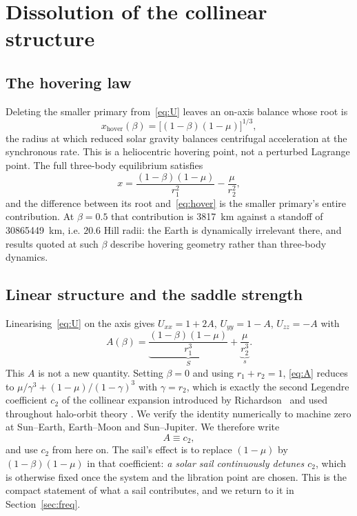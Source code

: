 \documentclass[pdflatex,sn-mathphys-num]{sn-jnl}
\begin{document}
\section{Dissolution of the collinear structure}\label{sec:dissolution}

\subsection{The hovering law}

Deleting the smaller primary from~\eqref{eq:U} leaves an on-axis balance whose
root is
\begin{equation}
  x_{\mathrm{hover}}(\beta) = \bigl[(1-\beta)(1-\mu)\bigr]^{1/3},
  \label{eq:hover}
\end{equation}
the radius at which reduced solar gravity balances centrifugal acceleration at
the synchronous rate. This is a heliocentric hovering point, not a perturbed
Lagrange point. The full three-body equilibrium satisfies
\begin{equation}
  x = \frac{(1-\beta)(1-\mu)}{r_1^{2}} - \frac{\mu}{r_2^{2}} ,
  \label{eq:balance}
\end{equation}
and the difference between its root and~\eqref{eq:hover} is the smaller
primary's entire contribution. At $\beta=0.5$ that contribution is
\SI{3817}{\kilo\metre} against a standoff of \SI{30865449}{\kilo\metre}, i.e.
$20.6$ Hill radii: the Earth is dynamically irrelevant there, and results quoted
at such $\beta$ describe hovering geometry rather than three-body dynamics.

\subsection{Linear structure and the saddle strength}

Linearising~\eqref{eq:U} on the axis gives
$U_{xx}=1+2A$, $U_{yy}=1-A$, $U_{zz}=-A$ with
\begin{equation}
  A(\beta) = \underbrace{\frac{(1-\beta)(1-\mu)}{r_1^{3}}}_{\textstyle S}
           + \underbrace{\frac{\mu}{r_2^{3}}}_{\textstyle s} .
  \label{eq:A}
\end{equation}
This $A$ is not a new quantity. Setting $\beta=0$ and using
$r_1+r_2=1$, \eqref{eq:A} reduces to
$\mu/\gamma^{3}+(1-\mu)/(1-\gamma)^{3}$ with $\gamma=r_2$, which is exactly the
second Legendre coefficient $c_2$ of the collinear expansion introduced by
Richardson~\cite{richardson1980} and used throughout halo-orbit theory
\cite{gomez2001,ceccaroni2016}. We verify the identity numerically to machine
zero at Sun--Earth, Earth--Moon and Sun--Jupiter. We therefore write
\begin{equation}
  A \equiv c_2 ,
  \label{eq:Ac2}
\end{equation}
and use $c_2$ from here on. The sail's effect is to replace $(1-\mu)$ by
$(1-\beta)(1-\mu)$ in that coefficient: \emph{a solar sail continuously detunes
$c_2$}, which is otherwise fixed once the system and the libration point are
chosen. This is the compact statement of what a sail contributes, and we return
to it in Section~\ref{sec:freq}.
\end{document}
